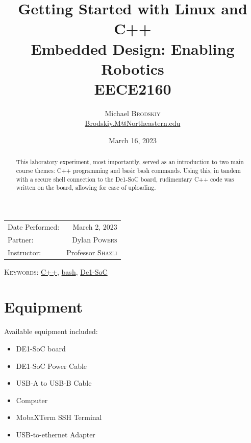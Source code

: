 \documentclass[
	letterpaper, %
	10pt, %
]{CSUniSchoolLabReport}
\title{Getting Started with Linux and C++\\ Embedded Design: Enabling Robotics \\ EECE2160} %
\author{Michael \textsc{Brodskiy}\\ \small \href{mailto:Brodskiy.M@Northeastern.edu}{Brodskiy.M@Northeastern.edu}}
\date{March 16, 2023} %
\begin{document}
\maketitle %

\begin{center}
	\begin{tabular}{l r}
		Date Performed: & March 2, 2023 \\ %
        Partner: & Dylan \textsc{Powers} \\ %
		Instructor: & Professor \textsc{Shazli} %
	\end{tabular}
\end{center}

\newpage

\begin{abstract}

  This laboratory experiment, most importantly, served as an introduction to two main course themes: C++ programming and basic bash commands. Using this, in tandem with a secure shell connection to the De1-SoC board, rudimentary C++ code was written on the board, allowing for ease of uploading.

\end{abstract}

\begin{flushleft}

  \textsc{Keywords:} \underline{C++}, \underline{bash}, \underline{De1-SoC}

\end{flushleft}

\newpage

\section{Equipment}

\hspace{.5 in} Available equipment included:\\

\begin{itemize}

  \item DE1-SoC board

  \item DE1-SoC Power Cable

  \item USB-A to USB-B Cable

  \item Computer

  \item MobaXTerm SSH Terminal

  \item USB-to-ethernet Adapter

\end{itemize}
\end{document}
